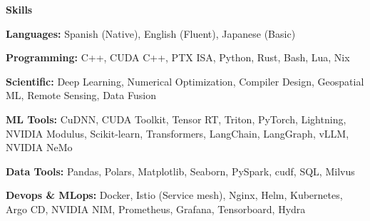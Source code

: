 \documentclass[11pt]{article}
\begin{document}
\begin{center}
    \textbf{Skills}
\end{center}

\textbf{Languages:} Spanish (Native), English (Fluent), Japanese (Basic)

\textbf{Programming:} C++, CUDA C++, PTX ISA, Python, Rust, Bash, Lua, Nix

\textbf{Scientific:} Deep Learning, Numerical Optimization, Compiler Design, Geospatial ML, Remote Sensing, Data Fusion

\textbf{ML Tools:} CuDNN, CUDA Toolkit, Tensor RT, Triton, PyTorch, Lightning, NVIDIA Modulus, Scikit-learn, Transformers, LangChain, LangGraph, vLLM, NVIDIA NeMo

\textbf{Data Tools:} Pandas, Polars, Matplotlib, Seaborn, PySpark, cudf, SQL, Milvus

\textbf{Devops \& MLops: } Docker, Istio (Service mesh), Nginx, Helm, Kubernetes, Argo CD, NVIDIA NIM, Prometheus, Grafana, Tensorboard, Hydra



\end{document}

